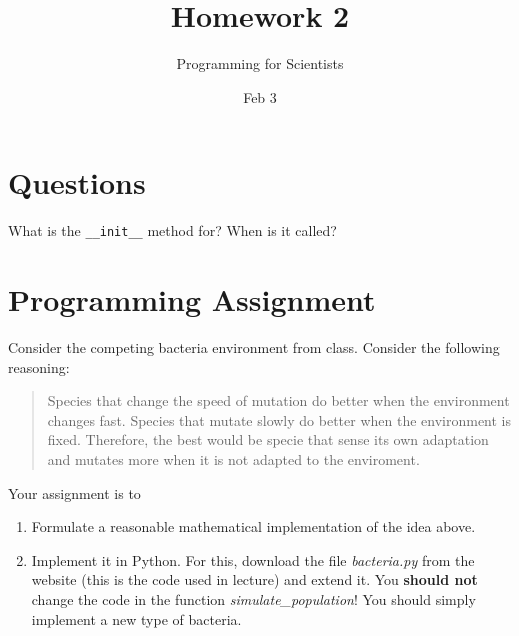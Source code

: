 
\author{Programming for Scientists}
\title{Homework 2}
\date{Feb 3}

\maketitle

\chapter{Questions}

\question
What is the \lstinline{__init__} method for? When is it called?

\question

\chapter{Programming Assignment}

Consider the competing bacteria environment from class. Consider the following reasoning:

\begin{quote}
Species that change the speed of mutation do better when the environment changes fast. Species that mutate slowly do better when the environment is fixed. Therefore, the best would be specie that sense its own adaptation and mutates more when it is not adapted to the enviroment.
\end{quote}

Your assignment is to 

\begin{enumerate}
\item Formulate a reasonable mathematical implementation of the idea above.
\item Implement it in Python. For this, download the file \textit{bacteria.py} from the website (this is the code used in lecture) and extend it. You \textbf{should not} change the code in the function \textit{simulate_population}! You should simply implement a new type of bacteria.
\end{enumerate} 


